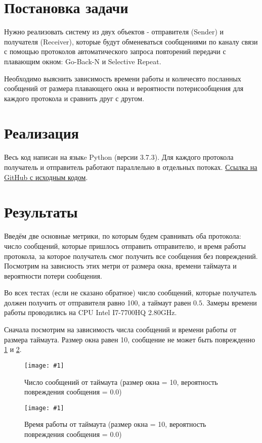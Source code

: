 \documentclass[a4paper,12pt]{article}
\newcommand{\plot}[3]{
    \begin{figure}[H]
        \begin{center}
            \texttt{[image: \#1]}
            \caption{#2}
            \label{#3}
        \end{center}
    \end{figure}
}
\begin{document}
    
    \newpage

    \tableofcontents
    \newpage

    \section{Постановка задачи}

    \quad Нужно реализовать систему из двух объектов - отправителя (Sender) и получателя (Receiver),
    которые будут обменеваться сообщениями по каналу связи с помощью протоколов автоматического запроса повторений передачи
    с плавающим окном: Go-Back-N и Selective Repeat.

    Необходимо выяснить зависимость времени работы и количесвто посланных сообщений от размера плавающего окна 
    и вероятности потерисообщения для каждого протокола и сравнить друг с другом.

    \section{Реализация}

    \quad Весь код написан на языкe Python (версии 3.7.3).
    Для каждого протокола получатель и отправитель работают параллельно в отдельных потоках.
    \href{https://github.com/kirillkuks/Networks/tree/master/lab1}{Ссылка на GitHub с исходным кодом}.

    \section{Результаты}
    \quad Введём две основные метрики, по которым будем сравнивать оба протокола:
    число сообщений, которые пришлось отправить отправителю, 
    и время работы протокола, за которое получатель смог получить все сообщения без повреждений.
    Посмотрим на зависиость этих метри от 
    размера окна, времени таймаута и вероятности потери сообщения.
    
    Во всех тестах (если не сказано обратное) число сообщений, которые получатель должен получить от отправителя равно 100,
    а таймаут равен $ 0.5 $. Замеры времени работы проводились на CPU Intel I7-7700HQ 2.80GHz.

    Сначала посмотрим на зависимость числа сообщений и времени работы от размера таймаута.
    Размер окна равен 10, сообщение не может быть поврежденно \ref{p:timeoutsMessageNum} и \ref{p:timeoutsWorkingTime}.

    \plot{timeoutsMessageNum}{Число сообщений от таймаута (размер окна = 10, вероятность повреждения сообщения = 0.0)}{p:timeoutsMessageNum}
    \plot{timeoutsWorkingTime}{Время работы от таймаута (размер окна = 10, вероятность повреждения сообщения = 0.0)}{p:timeoutsWorkingTime}
\end{document}

